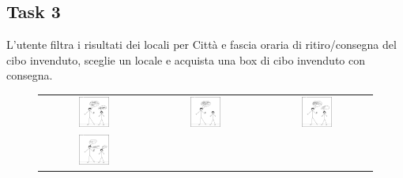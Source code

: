 \documentclass{article}
\begin{document}
\subsection{Task 3}
L'utente filtra i risultati dei locali per Città e fascia oraria di ritiro/consegna del cibo invenduto, sceglie un locale e acquista una box di cibo invenduto con consegna.
\begin{figure}[H]
    \centering
    \begin{tabular}{ccc}
        \includegraphics[width=0.3\textwidth]{Storyboard/task3-img/t3.1.png} &
        \includegraphics[width=0.3\textwidth]{Storyboard/task3-img/t3.2.png} &
        \includegraphics[width=0.3\textwidth]{Storyboard/task3-img/t3.3.png} \\
        \includegraphics[width=0.3\textwidth]{Storyboard/task3-img/t3.4.png} & & \\
    \end{tabular}
    \label{fig:task2}
\end{figure}
\end{document}
